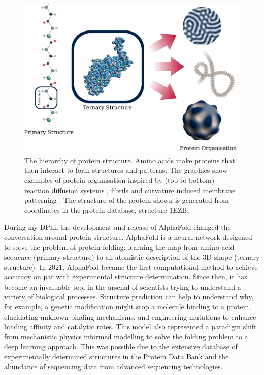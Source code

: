 \begin{figure}
    \centering
    \includegraphics[width=1\textwidth]{figures/1-intro-figs/proteinLevels.png}
    \caption{The hierarchy of protein structure. Amino acids make proteins that then interact to form structures and patterns. The graphics show examples of protein organisation inspired by (top to bottom) reaction diffusion systems \cite{turing_chemical_1952}, fibrils  and curvature induced membrane patterning \cite{agudo-canalejo_pattern_2017}. The structure of the protein shown is generated from coordinates in the protein database, structure 1EZB, \cite{garrett_solution_1997}}
    \label{fig:1-proteinLevels}
\end{figure}

During my DPhil the development and release of AlphaFold changed the conversation around protein structure. AlphaFold is a neural network desigened to solve the problem of protein folding: learning the map from amino acid sequence (primary structure) to an atomistic description of the 3D shape (ternary structure). In 2021, AlphaFold became the first computational method to achieve accuracy on par with experimental structure determination. \cite{jumper_highly_2021} Since then, it has become an invaluable tool in the arsenal of scientists trying to understand a variety of biological processes. Structure prediction can help to understand why, for example, a genetic modification might stop a molecule binding to a protein, elucidating unknown binding mechanisms, and engineering mutations to enhance binding affinity and catalytic rates. This model also represented a paradigm shift from mechanistic physics informed modelling to solve the folding problem to a deep learning approach. This was possible due to the extensive database of experimentally determined structures in the Protein Data Bank and the abundance of sequencing data from advanced sequencing technologies.

